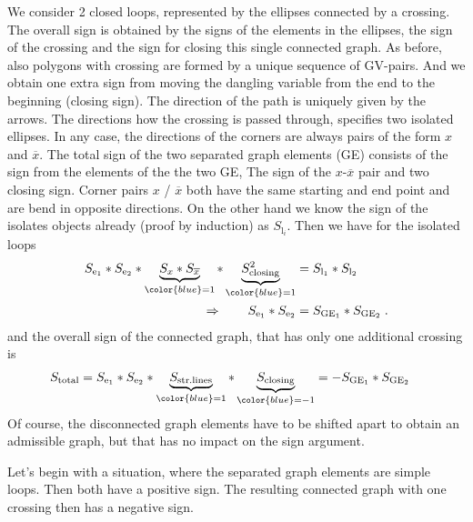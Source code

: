 We consider 2 closed loops, represented by the ellipses connected by a crossing. 
The overall sign is obtained by the signs of the elements in the ellipses, the sign of the crossing and the sign for closing this single connected graph. As before, also polygons with 
crossing are formed by a unique sequence of GV-pairs. And we obtain one extra sign from moving the dangling variable from the end to the beginning (closing sign).
The direction of the path is uniquely given by the arrows. The directions how the crossing is 
passed through, specifies two isolated ellipses. In any case, the directions of the corners
are always pairs of the form $x$ and $\overline x$. 
The total sign of the two separated graph elements (GE) consists of the sign from the elements of the the two 
GE, The sign of the $x$-$\overline x$ pair and two closing sign. 
Corner pairs $x$ / $\overline{x}$  both have the same starting and end point and are bend in opposite directions. On the other hand we know  the sign of the isolates objects already (proof by induction) as $S_{\text{l}_{i}}$. Then we have for the isolated loops
%
\begin{align*}
S_{\text{e}_{1}} * S_{\text{e}_{2}}  *
\underbrace{
S_{x} * S_{\overline x}
}_{\color{blue} = 1} * \underbrace{
S_{\text{closing}}^{2}
}_{\color{blue} = 1}
 &= S_{\text{l}_{1}} * S_{\text{l}_{2}}\\
\Rightarrow\qquad S_{\text{e}_{1}} * S_{\text{e}_{2}}
&= S_{\text{GE}_{1}} * S_{\text{GE}_{2}}\;.
\end{align*}
%
and the overall sign of the connected graph, that has  only one additional crossing is 
%
\begin{align}\label{eq:signrule:crossing}
S_{\text{total}} &= 
S_{\text{e}_{1}} * S_{\text{e}_{2}} * \underbrace{
S_{\text{str.lines}}
}_{\color{blue} = 1} * \underbrace{S_{\text{closing}}}_{\color{blue} = -1} = - S_{\text{GE}_{1}} * S_{\text{GE}_{2}}
\end{align}
%
Of course, the disconnected graph elements have to be shifted apart to obtain an admissible graph, but that has no impact on the sign argument.

Let's begin with a situation, where the separated graph elements are simple loops. Then both have a positive sign. The resulting connected graph with one crossing then has a negative sign.


